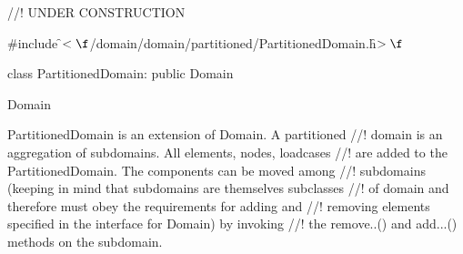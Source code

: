 
//! UNDER CONSTRUCTION

\indent \#include \f$<\f$/domain/domain/partitioned/PartitionedDomain.h\f$>\f$

\indent class PartitionedDomain: public Domain

\indent  Domain
\indent{}


\indent PartitionedDomain is an extension of Domain. A partitioned
//! domain is an aggregation of subdomains. All elements, nodes, loadcases
//! are added to the PartitionedDomain. The components can be moved among 
//! subdomains (keeping in mind that subdomains are themselves subclasses
//! of domain and therefore must obey the requirements for adding and
//! removing elements specified in the interface for Domain) by invoking
//! the remove..() and add...() methods on the subdomain.


